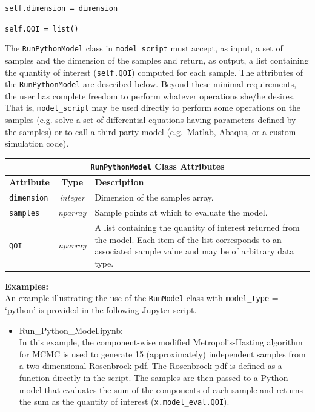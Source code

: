\hspace{1cm} \texttt{self.dimension = dimension}

\hspace{1cm} \texttt{self.QOI = list()}
\vspace{4mm}

\noindent The \texttt{RunPythonModel} class in \texttt{model\_script} must accept, as input, a set of samples and the dimension of the samples and return, as output, a list containing the quantity of interest (\texttt{self.QOI}) computed for each sample. The attributes of the \texttt{RunPythonModel} are described below. Beyond these minimal requirements, the user has complete freedom to perform whatever operations she/he desires. That is, \texttt{model\_script} may be used directly to perform some operations on the samples (e.g. solve a set of differential equations having parameters defined by the samples) or to call a third-party model (e.g.\ Matlab, Abaqus, or a custom simulation code). 


\begin{center}
	\begin{tabular}{ |l|c|l| } 
				\hline
		\multicolumn{3}{|c|}{\texttt{RunPythonModel} Class Attributes} \\
		\hline
		\textbf{Attribute} & \textbf{Type} & \textbf{Description}  \\
		\hline
		\texttt{dimension} & {\it integer} & Dimension of the samples array. \\ 
		\hline
		\texttt{samples} & {\it nparray} & Sample points at which to evaluate the model. \\ 
		\hline
		\texttt{QOI} & {\it nparray} & A list containing the quantity of interest returned from the model. Each item of the list corresponds to an associated sample value and may be of arbitrary data type.  \\ 
		\hline
	\end{tabular}%
\end{center}

\noindent\textbf{Examples:}\\
\noindent An example illustrating the use of the \texttt{RunModel} class with \texttt{model\_type} = `python' is provided in the following Jupyter script.
\begin{itemize}
\item Run\_Python\_Model.ipynb:\\
	In this example, the component-wise modified Metropolis-Hasting algorithm for MCMC is used to generate 15 (approximately) independent samples from a two-dimensional Rosenbrock pdf. The Rosenbrock pdf is defined as a function directly in the script. The samples are then passed to a Python model that evaluates the sum of the components of each sample and returns the sum as the quantity of interest (\texttt{x.model\_eval.QOI}).
\end{itemize}

